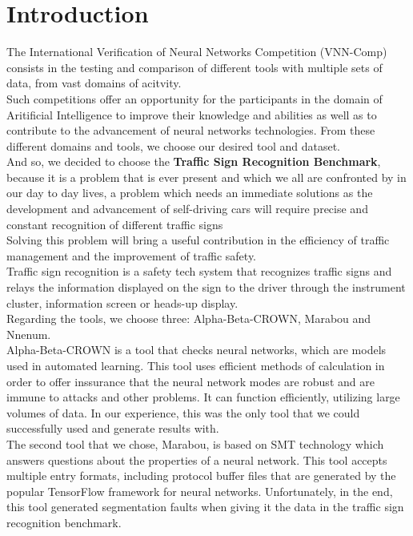 \documentclass[12pt,a4paper]{report}
\begin{document}
\chapter{Introduction}
The International Verification of Neural Networks Competition (VNN-Comp) consists in the testing and comparison of different tools with multiple sets of data, from vast domains of acitvity.\\
Such competitions offer an opportunity for the participants in the domain of Aritificial Intelligence to improve their knowledge and abilities as well as to contribute to the advancement of neural networks technologies. From these different domains and tools, we choose our desired tool and dataset.\\
And so, we decided to choose the \textbf{Traffic Sign Recognition Benchmark}, because it is a problem that is ever present and which we all are confronted by in our day to day lives, a problem which needs an immediate solutions as the development and advancement of self-driving cars will require precise and constant recognition of different traffic signs \\
Solving this problem will bring a useful contribution in the efficiency of traffic management and the improvement of traffic safety.\\
Traffic sign recognition is a safety tech system that recognizes traffic signs and relays the information displayed on the sign to the driver through the instrument cluster, information screen or heads-up display.\\
Regarding the tools, we choose three: Alpha-Beta-CROWN, Marabou and Nnenum.\\
Alpha-Beta-CROWN is a tool that checks neural networks, which are models used in automated learning. This tool uses efficient methods of calculation in order to offer inssurance that the neural network modes are robust and are immune to attacks and other problems. It can function efficiently, utilizing large volumes of data. In our experience, this was the only tool that we could successfully used and generate results with.\\
The second tool that we chose, Marabou, is based on SMT technology which answers questions about the properties of a neural network. This tool accepts multiple entry formats, including protocol buffer files that are generated by the popular TensorFlow framework for neural networks. Unfortunately, in the end, this tool generated segmentation faults when giving it the data in the traffic sign recognition benchmark.\\
\end{document}

